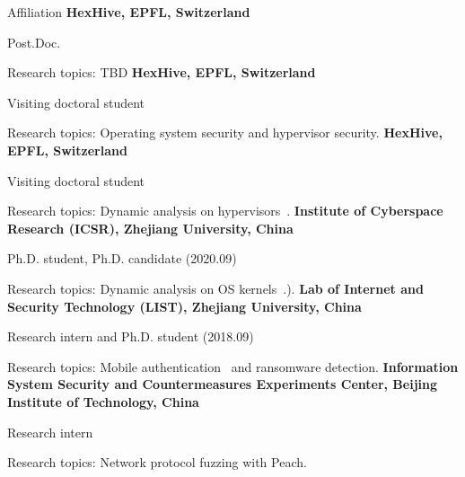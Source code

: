 \begin{rubric}{Affiliation}
\entry*[2023.11 -- 202x.xx]
	\textbf{HexHive, EPFL, Switzerland}
	\par Post.Doc.
	\par Research topics: TBD
\entry*[2023.02 -- 2023.09]
	\textbf{HexHive, EPFL, Switzerland}
	\par Visiting doctoral student
	\par Research topics: Operating system security and hypervisor security.
\entry*[2021.08 -- 2022.03]
	\textbf{HexHive, EPFL, Switzerland}
	\par Visiting doctoral student
	\par Research topics: Dynamic analysis on hypervisors~\cite{videzzo@2023}.
\entry*[2019.05 -- 2023.09]
	\textbf{Institute of Cyberspace Research (ICSR), Zhejiang University, China}
	\par Ph.D. student, Ph.D. candidate (2020.09)
	\par Research topics: Dynamic analysis on OS kernels~\cite{liu2021firmguide,jiang2021ecmo}.).
\entry*[2017.07 -- 2019.04]
    \textbf{Lab of Internet and Security Technology (LIST), Zhejiang University, China}
	\par Research intern and Ph.D. student (2018.09)
	\par Research topics: Mobile authentication~\cite{espialcog@2020,onecycleattack@2021,trapcog@2023} and ransomware detection.
\entry*[2016.09 -- 2017.06]
	\textbf{Information System Security and Countermeasures Experiments Center,
	Beijing Institute of Technology, China} 
	\par Research intern
	\par Research topics: Network protocol fuzzing with Peach.
\end{rubric}